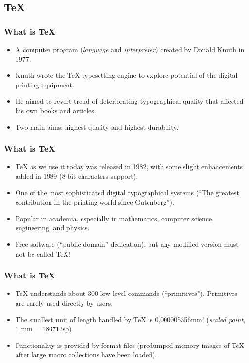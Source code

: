\documentclass{beamer}
\begin{document}
\subsection{\TeX}
\begin{frame}
\frametitle{What is \TeX}

\begin{itemize}
\item A computer program (\textit{language} and \textit{interpreter}) created by Donald Knuth in 1977.
\item Knuth wrote the \TeX{} typesetting engine to explore potential of the digital printing equipment.
\item He aimed to revert trend of deteriorating typographical quality that affected his own books and articles.
\item Two main aims: highest \alert{quality} and highest \alert{durability}.
\end{itemize}

\end{frame}


\begin{frame}
\frametitle{What is \TeX}

\begin{itemize}
\item \TeX{} as we use it today was released in 1982, with some slight enhancements added
in 1989 (8-bit characters support).
\item One of the most sophisticated digital typographical systems (``The greatest contribution in the printing world since Gutenberg''). 
\item Popular in academia, especially in mathematics, computer science, engineering, and physics. 
\item Free software (``public domain'' dedication): but any modified version must not be called \TeX!
\end{itemize}

\end{frame}





\begin{frame}
\frametitle{What is \TeX}

\begin{itemize}
\item \TeX{} understands about 300 low-level commands (``primitives''). Primitives are rarely used directly by users.
\item The smallest unit of length handled by TeX is 0,000005356mm! (\textit{scaled point}, 1 mm = 186712sp) 
\item Functionality is provided by \alert{format files} (predumped memory images of \TeX{} after large macro collections have been loaded).
\end{itemize}

\end{frame}
\end{document}
